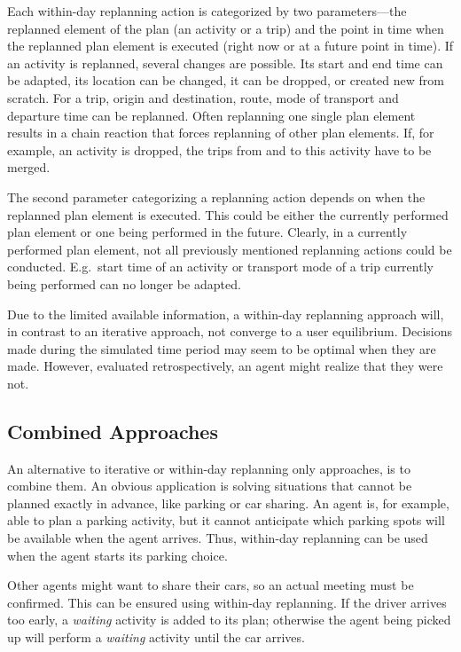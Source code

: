 Each within-day replanning action is categorized by two parameters---the replanned element of the plan (an activity or a trip) and the point in time when the replanned plan element is executed (right now or at a future point in time). If an activity is replanned, several changes are possible. Its start and end time can be adapted, its location can be changed, it can be dropped, or created new from scratch. For a trip, origin and destination, route, mode of transport and departure time can be replanned. Often replanning one single plan element results in a chain reaction that forces replanning of other plan elements. If, for example, an activity is dropped, the trips from and to this activity have to be merged.

The second parameter categorizing a replanning action depends on when the replanned plan element is executed. This could be either the currently performed plan element or one being performed in the future. Clearly, in a currently performed plan element, not all previously mentioned replanning actions could be conducted. E.g.\ start time of an activity or transport mode of a trip currently being performed can no longer be adapted.

Due to the limited available information, a within-day replanning approach will, in contrast to an iterative approach, not converge to a user equilibrium. Decisions made during the simulated time period may seem to be optimal when they are made. However, evaluated retrospectively, an agent might realize that they were not.

\subsection{Combined Approaches} \label{sec:CombinedApproaches}

An alternative to iterative or within-day replanning only approaches, is to combine them. An obvious application is solving situations that cannot be planned exactly in advance, like parking or car sharing. An agent is, for example, able to plan a parking activity, but it cannot anticipate which parking spots will be available when the agent arrives. Thus, within-day replanning can be used when the agent starts its parking choice.

Other agents might want to share their cars, so an actual meeting must be confirmed. This can be ensured using within-day replanning. If the driver arrives too early, a \emph{waiting} activity is added to its plan; otherwise the agent being picked up will perform a \emph{waiting} activity until the car arrives.


